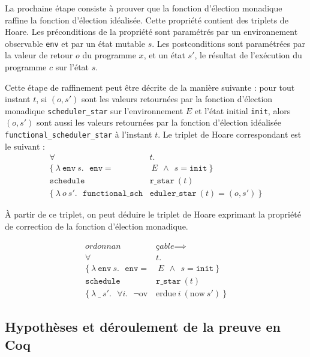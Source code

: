 	La prochaine étape consiste à prouver que la fonction d'élection monadique raffine la fonction d'élection idéalisée. Cette propriété contient des triplets de Hoare. 
	Les préconditions de la propriété sont paramétrés par un environnement observable \texttt{env} et par un état mutable $s$. Les postconditions sont paramétrées par la valeur de retour $o$ du programme $x$, et un état $s'$, le résultat de l'exécution du programme $c$ sur l'état $s$.

	Cette étape de raffinement peut être décrite de la manière suivante : pour tout instant $t$, si $(o, s')$ sont les valeurs retournées par la fonction d'élection monadique \texttt{scheduler\_star} sur l'environnement $E$ et l'état initial \texttt{init}, alors $(o, s')$ sont aussi les valeurs retournées par la fonction d'élection idéalisée \texttt{functional\_scheduler\_star} à l'instant $t$. Le triplet de Hoare correspondant est le suivant :
	\begin{equation}
	\begin{split}
		\forall& t.\\
		\{
		~\lambda~\mathtt{env}~s.~~~\mathtt{env} =&~E~~\land~~s = \mathtt{init}~
		\}\\
		\texttt{schedule}&\texttt{r\_star}~(t)\\
		\{
		~\lambda~o~s'.~~~\texttt{functional\_sch}&\texttt{eduler\_star}~(t) = (o,s')~
		\}
	\end{split}
	\end{equation}

	À partir de ce triplet, on peut déduire le triplet de Hoare exprimant la propriété de correction de la fonction d'élection monadique.

	\begin{equation}
	\begin{split}
		\textit{ordonnan}&\textit{çable} \implies\\
		\forall& t.\\
		\{
		~\lambda~\mathtt{env}~s.~~~\mathtt{env} =& ~E~~\land~~s = \mathtt{init}~
		\}\\
		\texttt{schedule}&\texttt{r\_star}~(t)\\
		\{
		~\lambda~\_~s'.~~~\forall i.~~~\neg \text{ov}&\text{erdue}~i~(\text{now}~s') ~
		\}
	\end{split}
	\end{equation}

	\subsection{Hypothèses et déroulement de la preuve en Coq}

